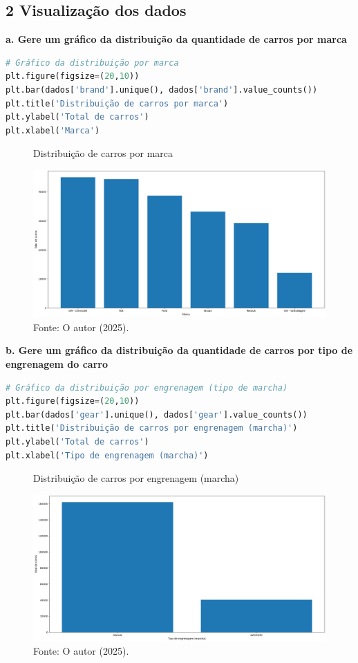 \subsection*{\textbf{2 Visualização dos dados}}
\begin{adjustwidth}{1em}{}
\textbf{a. Gere um gráfico da distribuição da quantidade de carros por marca}
\end{adjustwidth}
\begin{lstlisting}[language=Python, style=input]
# Gráfico da distribuição por marca
plt.figure(figsize=(20,10)) 
plt.bar(dados['brand'].unique(), dados['brand'].value_counts()) 
plt.title('Distribuição de carros por marca') 
plt.ylabel('Total de carros') 
plt.xlabel('Marca') 
\end{lstlisting}
\begin{figure}[H]
\centering
\caption{Distribuição de carros por marca}
\includegraphics[width=1\linewidth]{apendices/fig/2_IAA002_1.png}
\caption*{Fonte: O autor (2025).}
\end{figure}

\begin{adjustwidth}{1em}{}
\textbf{b. Gere um gráfico da distribuição da quantidade de carros por tipo de engrenagem do carro}
\end{adjustwidth}
\begin{lstlisting}[language=Python, style=input]
# Gráfico da distribuição por engrenagem (tipo de marcha)
plt.figure(figsize=(20,10)) 
plt.bar(dados['gear'].unique(), dados['gear'].value_counts()) 
plt.title('Distribuição de carros por engrenagem (marcha)') 
plt.ylabel('Total de carros') 
plt.xlabel('Tipo de engrenagem (marcha)') 
\end{lstlisting}
\begin{figure}[H]
\centering
\caption{Distribuição de carros por engrenagem (marcha)}
\includegraphics[width=1\linewidth]{apendices/fig/2_IAA002_2.png}
\caption*{Fonte: O autor (2025).}
\end{figure}

